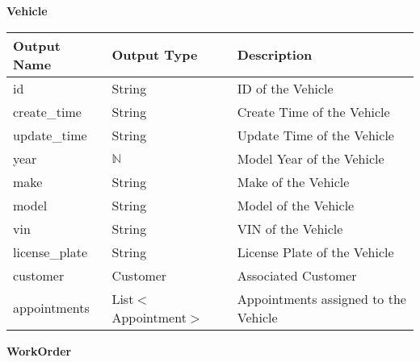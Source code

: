 \documentclass[12pt, titlepage]{article}
\begin{document}
\textbf{Vehicle}

\begin{table}[H]
	\begin{tabular}{|l|l|l|}
		\hline
		\textbf{Output Name} & \textbf{Output Type}  & \textbf{Description}                 \\
		\hline
		id                   & String                & ID of the Vehicle                    \\
		\hline
		create\_time         & String                & Create Time of the Vehicle           \\
		\hline
		update\_time         & String                & Update Time of the Vehicle           \\
		\hline
		year                 & $\mathbb{N}$          & Model Year of the Vehicle            \\
		\hline
		make                 & String                & Make of the Vehicle                  \\
		\hline
		model                & String                & Model of the Vehicle                 \\
		\hline
		vin                  & String                & VIN of the Vehicle                   \\
		\hline
		license\_plate       & String                & License Plate of the Vehicle         \\
		\hline
		customer             & Customer              & Associated Customer                  \\
		\hline
		appointments         & List$<$Appointment$>$ & Appointments assigned to the Vehicle \\
		\hline
	\end{tabular}
\end{table}

\textbf{WorkOrder}
\end{document}

